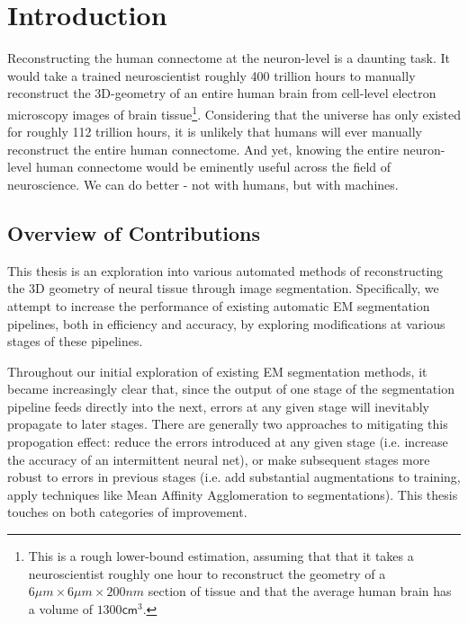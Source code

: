 \chapter{Introduction}

Reconstructing the human connectome at the neuron-level is a daunting task. It would take a trained neuroscientist roughly 400 trillion hours to manually reconstruct the 3D-geometry of an entire human brain from cell-level electron microscopy images of brain tissue\footnote{This is a rough lower-bound estimation, assuming that that it takes a neuroscientist roughly one hour to reconstruct the geometry of a $6\mu m \times 6\mu m \times 200nm $ section of tissue and that the average human brain has a volume of $1300\mathsf{cm}^{3}$.}. Considering that the universe has only existed for roughly 112 trillion hours, it is unlikely that humans will ever manually reconstruct the entire human connectome. And yet, knowing the entire neuron-level human connectome would be eminently useful across the field of neuroscience. We can do better - not with humans, but with machines.


\section{Overview of Contributions}

This thesis is an exploration into various automated methods of reconstructing the 3D geometry of neural tissue through image segmentation. Specifically, we attempt to increase the performance of existing automatic EM segmentation pipelines, both in efficiency and accuracy, by exploring modifications at various stages of these pipelines. 

Throughout our initial exploration of existing EM segmentation methods, it became increasingly clear that, since the output of one stage of the segmentation pipeline feeds directly into the next, errors at any given stage will inevitably propagate to later stages. There are generally two approaches to mitigating this propogation effect: reduce the errors introduced at any given stage (i.e. increase the accuracy of an intermittent neural net), or make subsequent stages more robust to errors in previous stages (i.e. add substantial augmentations to training, apply techniques like Mean Affinity Agglomeration to segmentations). This thesis touches on both categories of improvement.

